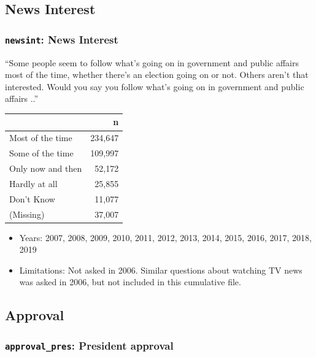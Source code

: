 \documentclass[10pt,article,oneside]{memoir}
\theoremstyle{definition}
\begin{document}
\hypertarget{news-interest}{%
\subsection{News Interest}\label{news-interest}}

\hypertarget{newsint-news-interest}{%
\subsubsection{\texorpdfstring{\texttt{newsint}: News
Interest}{newsint: News Interest}}\label{newsint-news-interest}}

``Some people seem to follow what's going on in government and public
affairs most of the time, whether there's an election going on or not.
Others aren't that interested. Would you say you follow what's going on
in government and public affairs ..''

\begin{table}[H]
\centering
\begin{tabular}{lr}
\toprule
 & n\\
\midrule
Most of the time & 234,647\\
Some of the time & 109,997\\
Only now and then & 52,172\\
Hardly at all & 25,855\\
Don't Know & 11,077\\
(Missing) & 37,007\\
\bottomrule
\end{tabular}
\end{table}

\begin{itemize}
\tightlist
\item
  Years: 2007, 2008, 2009, 2010, 2011, 2012, 2013, 2014, 2015, 2016,
  2017, 2018, 2019
\item
  Limitations: Not asked in 2006. Similar questions about watching TV
  news was asked in 2006, but not included in this cumulative file.
\end{itemize}

\hypertarget{approval}{%
\subsection{Approval}\label{approval}}

\hypertarget{approval_pres-president-approval}{%
\subsubsection{\texorpdfstring{\texttt{approval\_pres}: President
approval}{approval\_pres: President approval}}\label{approval_pres-president-approval}}
\end{document}
